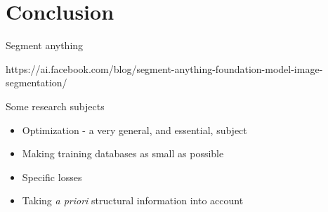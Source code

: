 \documentclass[xcolor=pdftex,dvipsnames,table,mathserif]{beamer}
\newcommand{\source}[1]{\begin{textblock*}{4cm}(8.7cm,8.6cm)
    \begin{beamercolorbox}[ht=0.5cm,right]{framesource}
      \usebeamerfont{framesource}\usebeamercolor[fg]{framesource} Credits: {#1}
    \end{beamercolorbox}
\end{textblock*}}
\begin{document}




\section{Conclusion}


\begin{frame}{Segment anything}


  https://ai.facebook.com/blog/segment-anything-foundation-model-image-segmentation/

\end{frame}



\begin{frame}{Some research subjects}

  \begin{itemize}
  \item Optimization - a very general, and essential, subject
  \item Making training databases as small as possible
  \item Specific losses
  \item Taking  {\it a priori} structural information into account
  \end{itemize}

\end{frame}
\end{document}
